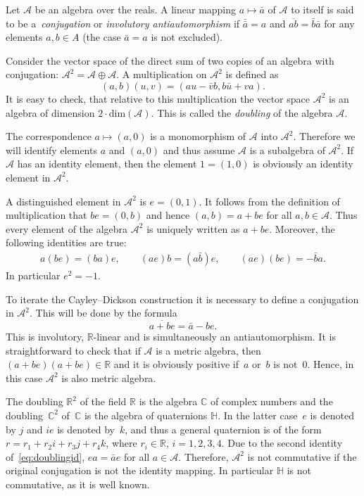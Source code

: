 \documentclass[10pt,a4paper]{amsart}
\numberwithin{equation}{section}
\newcommand{\SR}{\mathbb{R}} %
\newcommand{\SC}{\mathbb{C}} %
\newcommand{\SH}{\mathbb{H}} %
\begin{document}
Let $\mathcal{A}$ be an algebra over the reals. A linear mapping $a \mapsto \bar{a}$ of $\mathcal{A}$ to itself is said to be a~\textit{conjugation} or \textit{involutory antiautomorphism} if $\bar{\bar{a}}=a$ and $\overline{ab}=\bar{b}\bar{a}$ for any elements $a,b \in A$ (the case $\bar{a}=a$ is not excluded).
\begin{Definition} Consider the vector space of the direct sum of two copies of an algebra with conjugation: $\mathcal{A}^2=\mathcal{A} \oplus \mathcal{A}$. A multiplication on $\mathcal{A}^2$ is defined as
 \[(a,b)(u,v)=(au-\bar{v}b,b\bar{u}+va).\]
 It is easy to check, that relative to this multiplication the vector space $\mathcal{A}^2$ is an algebra of dimension $2 \cdot \mathrm{dim}(\mathcal{A})$. This is called the \textit{doubling} of the algebra $\mathcal{A}$.
\end{Definition}
\begin{Remark} The correspondence $a \mapsto (a,0)$ is a monomorphism of $\mathcal{A}$ into $\mathcal{A}^2$. Therefore we will identify elements $a$ and $(a,0)$ and thus assume $\mathcal{A}$ is a subalgebra of $\mathcal{A}^2$. If $\mathcal{A}$ has an identity element, then the element $1=(1,0)$ is obviously an identity element in $\mathcal{A}^2$.
\end{Remark}
A distinguished element in $\mathcal{A}^2$ is $e=(0,1)$. It follows from the definition of multiplication that $be=(0,b)$ and hence $(a,b)=a+be$ for all $a,b\in \mathcal{A}$. Thus every element of the algebra $\mathcal{A}^2$ is uniquely written as $a+be$. Moreover, the following identities are true:
\begin{gather}a(be)=(ba)e, \qquad (ae)b=(a\bar{b})e, \qquad (ae)(be)=-\bar{b}a.\label{eq:doublingid}
\end{gather}
In particular $e^2=-1$.

To iterate the Cayley--Dickson construction it is necessary to define a conjugation in $\mathcal{A}^2$. This will be done by the formula
\[\overline{a+be}=\bar{a}-be.\]
This is involutory, $\SR$-linear and is simultaneously an antiautomorphism. It is straightforward to check that if $\mathcal{A}$ is a metric algebra, then $(a+be)\overline{(a+be)} \in \SR$ and it is obviously positive if~$a$ or~$b$ is not~0. Hence, in this case $\mathcal{A}^2$ is also metric algebra.

The doubling $\SR^2$ of the field $\SR$ is the algebra $\SC$ of complex numbers and the doubling~$\SC^2$ of~$\SC$ is the algebra of quaternions $\SH$. In the latter case~$e$ is denoted by $j$ and $ie$ is denoted by~$k$, and thus a general quaternion is of the form $r=r_1+r_2i+r_3j+r_4k$, where $r_i \in \SR$, $i=1,2,3,4$. Due to the second identity of~\eqref{eq:doublingid}, $ea=\bar{a}e$ for all $a \in \mathcal{A}$. Therefore, $\mathcal{A}^2$ is not commutative if the original conjugation is not the identity mapping. In particular $\SH$ is not commutative, as it is well known.
\end{document}
